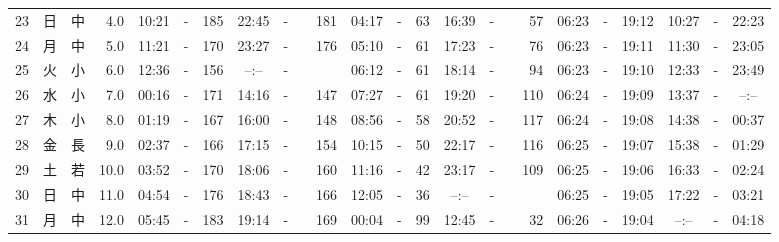 \documentclass[12pt,a4j]{jsarticle}
\begin{document}
\begin{table}[htbp]
\begin{center}
{\begin{tabular}{|rc|cr|ccrccr|ccrccr|ccc|ccc|}
23 & 日 & 中 &  4.0 &  10:21 &-& 185 &  22:45 &-& 181 &  04:17 &-&  63 &  16:39 &-&  57 & 06:23 & -& 19:12 & 10:27 & -& 22:23 \\
24 & 月 & 中 &  5.0 &  11:21 &-& 170 &  23:27 &-& 176 &  05:10 &-&  61 &  17:23 &-&  76 & 06:23 & -& 19:11 & 11:30 & -& 23:05 \\
25 & 火 & 小 &  6.0 &  12:36 &-& 156 &  --:-- &-&~~~~~ &  06:12 &-&  61 &  18:14 &-&  94 & 06:23 & -& 19:10 & 12:33 & -& 23:49 \\
26 & 水 & 小 &  7.0 &  00:16 &-& 171 &  14:16 &-& 147 &  07:27 &-&  61 &  19:20 &-& 110 & 06:24 & -& 19:09 & 13:37 & -& --:-- \\
27 & 木 & 小 &  8.0 &  01:19 &-& 167 &  16:00 &-& 148 &  08:56 &-&  58 &  20:52 &-& 117 & 06:24 & -& 19:08 & 14:38 & -& 00:37 \\
28 & 金 & 長 &  9.0 &  02:37 &-& 166 &  17:15 &-& 154 &  10:15 &-&  50 &  22:17 &-& 116 & 06:25 & -& 19:07 & 15:38 & -& 01:29 \\
29 & 土 & 若 & 10.0 &  03:52 &-& 170 &  18:06 &-& 160 &  11:16 &-&  42 &  23:17 &-& 109 & 06:25 & -& 19:06 & 16:33 & -& 02:24 \\
30 & 日 & 中 & 11.0 &  04:54 &-& 176 &  18:43 &-& 166 &  12:05 &-&  36 &  --:-- &-&~~~~~ & 06:25 & -& 19:05 & 17:22 & -& 03:21 \\
31 & 月 & 中 & 12.0 &  05:45 &-& 183 &  19:14 &-& 169 &  00:04 &-&  99 &  12:45 &-&  32 & 06:26 & -& 19:04 & --:-- & -& 04:18 \\
   \hline
   \end{tabular}}
   \end{center}
\end{table}
\newpage
\end{document}
